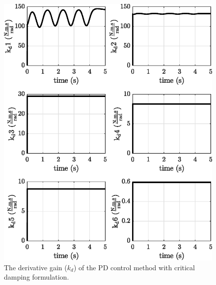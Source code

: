 \begin{figure}
    \centering
    \includegraphics{images/act_1.5_sin/kd.eps}
    \caption{The derivative gain ($k_d$) of the PD control method with critical damping formulation.}
    \label{fig:act_1.5_sin_k_d}
\end{figure}